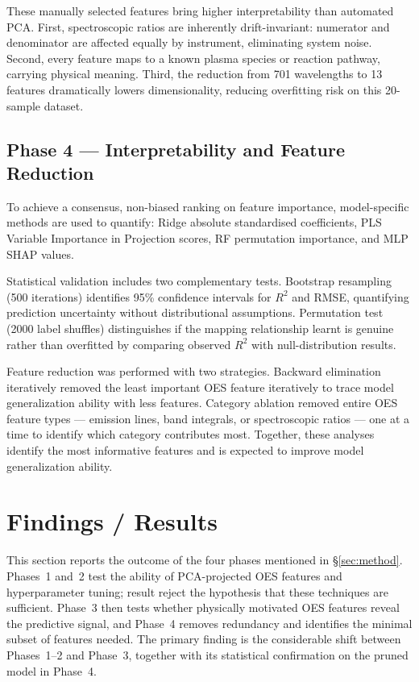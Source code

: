 \documentclass[12pt, a4paper]{article}
\begin{document}
These manually selected features bring higher interpretability than automated PCA. First, spectroscopic ratios are inherently drift-invariant: numerator and denominator are affected equally by instrument, eliminating system noise. Second, every feature maps to a known plasma species or reaction pathway, carrying physical meaning. Third, the reduction from 701 wavelengths to 13 features dramatically lowers dimensionality, reducing overfitting risk on this 20-sample dataset.

\subsection{Phase 4 --- Interpretability and Feature Reduction}

To achieve a consensus, non-biased ranking on feature importance, model-specific methods are used to quantify: Ridge absolute standardised coefficients, PLS Variable Importance in Projection scores, RF permutation importance, and MLP SHAP values. 

Statistical validation includes two complementary tests. Bootstrap resampling (500 iterations) identifies 95\% confidence intervals for $R^2$ and RMSE, quantifying prediction uncertainty without distributional assumptions. Permutation test (2000 label shuffles) distinguishes if the mapping relationship learnt is genuine rather than overfitted by comparing observed $R^2$ with null-distribution results.

Feature reduction was performed with two strategies. Backward elimination iteratively removed the least important OES feature iteratively to trace model generalization ability with less features. Category ablation removed entire OES feature types --- emission lines, band integrals, or spectroscopic ratios --- one at a time to identify which category contributes most. Together, these analyses identify the most informative features and is expected to improve model generalization ability.

\newpage
\section{Findings / Results}
\label{sec:results}

This section reports the outcome of the four phases mentioned in \S\ref{sec:method}. Phases~1 and~2 test the ability of PCA-projected OES features and hyperparameter tuning; result reject the hypothesis that these techniques are sufficient. Phase~3 then tests whether physically motivated OES features reveal the predictive signal, and Phase~4 removes redundancy and identifies the minimal subset of features needed. The primary finding is the considerable shift between Phases~1--2 and Phase~3, together with its statistical confirmation on the pruned model in Phase~4.
\end{document}
